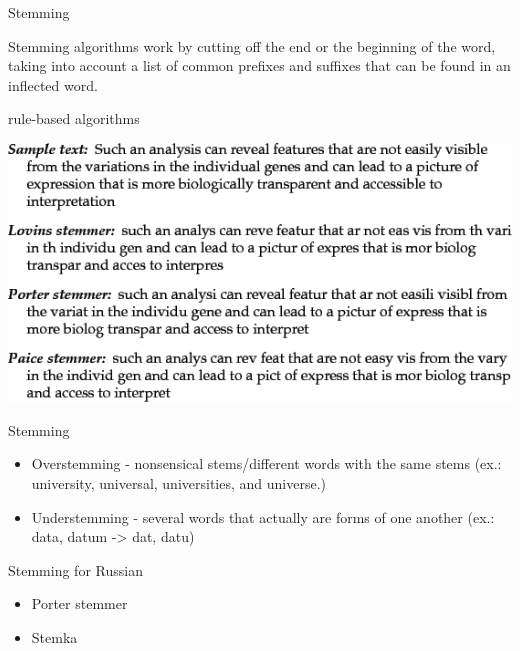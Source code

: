 \documentclass{beamer}
\begin{document}
    \begin{frame}{Stemming}

        Stemming algorithms work by cutting off the end or the beginning of the word,
        taking into account a list of common prefixes and suffixes that can be found in an inflected word.

        rule-based algorithms

        \includegraphics[width=\textwidth]{stemming_examples}
    \end{frame}

    \begin{frame}{Stemming}
        \begin{itemize}
            \item Overstemming - nonsensical stems/different words with the same stems (ex.: university, universal, universities, and universe.)
            \item Understemming - several words that actually are forms of one another (ex.: data, datum -> dat, datu)
        \end{itemize}
    \end{frame}

    \begin{frame}{Stemming for Russian}
        \begin{itemize}
            \item Porter stemmer
            \item Stemka
        \end{itemize}
    \end{frame}
\end{document}
